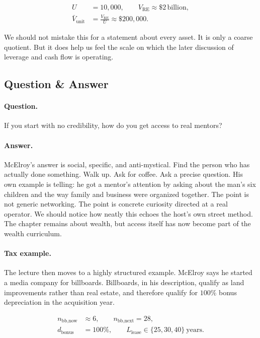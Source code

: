 \begin{align}
U &= 10{,}000,\qquad V_{\text{RE}} \approx \$2\,\text{billion},\\
\bar V_{\text{unit}} &= \frac{V_{\text{RE}}}{U} \approx \$200{,}000.
\end{align}

We should not mistake this for a statement about every asset. It is only a coarse quotient. But it does help us feel the scale on which the later discussion of leverage and cash flow is operating.

\subsection{Question \& Answer}

\paragraph{Question.} If you start with no credibility, how do you get access to real mentors?

\paragraph{Answer.} McElroy's answer is social, specific, and anti-mystical. Find the person who has actually done something. Walk up. Ask for coffee. Ask a precise question. His own example is telling: he got a mentor's attention by asking about the man's six children and the way family and business were organized together. The point is not generic networking. The point is concrete curiosity directed at a real operator. We should notice how neatly this echoes the host's own street method. The chapter remains about wealth, but access itself has now become part of the wealth curriculum.

\paragraph{Tax example.} The lecture then moves to a highly structured example. McElroy says he started a media company for billboards. Billboards, in his description, qualify as land improvements rather than real estate, and therefore qualify for \(100\%\) bonus depreciation in the acquisition year.

\begin{align}
n_{\text{bb,now}} &\approx 6,\qquad n_{\text{bb,next}} = 28,\\
d_{\text{bonus}} &= 100\%,\qquad L_{\text{lease}} \in \{25,30,40\}\ \text{years}.
\end{align}

